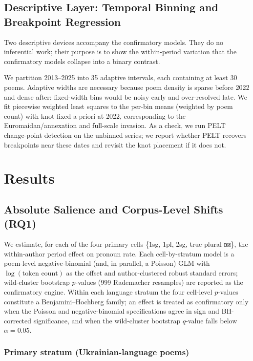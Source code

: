 \documentclass[12pt]{interact}
\theoremstyle{plain}%
\theoremstyle{definition}
\theoremstyle{remark}
\begin{document}
\subsection{Descriptive Layer: Temporal Binning and Breakpoint Regression}

Two descriptive devices accompany the confirmatory models. They do no inferential work; their purpose is to show the within-period variation that the confirmatory models collapse into a binary contrast.

We partition 2013–2025 into 35 adaptive intervals, each containing at least 30 poems. Adaptive widths are necessary because poem density is sparse before 2022 and dense after: fixed-width bins would be noisy early and over-resolved late. We fit piecewise weighted least squares to the per-bin means (weighted by poem count) with knot fixed a priori at 2022, corresponding to the Euromaidan/annexation and full-scale invasion. As a check, we run PELT change-point detection on the unbinned series; we
report whether PELT recovers breakpoints near these dates and revisit the knot placement if it does not.


\section{Results}

\subsection{Absolute Salience and Corpus-Level Shifts (RQ1)}
\label{sec:results-rq1}

We estimate, for each of the four primary cells \{1sg, 1pl, 2sg, true-plural \textukrainian{ви}\}, the within-author period effect on pronoun rate. Each cell-by-stratum model is a poem-level negative-binomial (and, in parallel, a Poisson) GLM with $\log(\text{token count})$ as the offset and author-clustered robust standard errors; wild-cluster bootstrap $p$-values (999 Rademacher resamples) are reported as the confirmatory engine. Within each language stratum the four cell-level $p$-values constitute a Benjamini--Hochberg family; an effect is treated as confirmatory only when the Poisson and negative-binomial specifications agree in sign and BH-corrected significance, and when the wild-cluster bootstrap $q$-value falls below $\alpha = 0.05$.

\subsubsection{Primary stratum (Ukrainian-language poems)}
\end{document}
